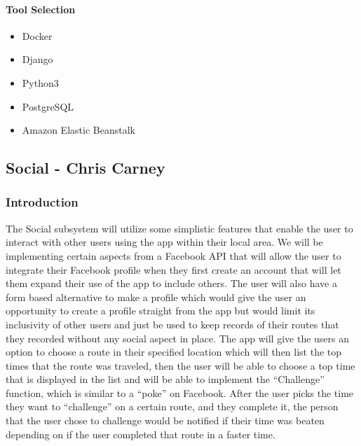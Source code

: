 \documentclass{article}
\begin{document}
\paragraph{Tool Selection}
\begin{itemize}
    \item Docker
    \item Django
    \item Python3
    \item PostgreSQL
    \item Amazon Elastic Beanstalk
\end{itemize}

\subsection{Social - Chris Carney}
\subsubsection{Introduction}
The Social subsystem will utilize some simplistic features that enable the user to interact with other users using the app within their local area. We will be implementing certain aspects from a Facebook API that will allow the user to integrate their Facebook profile when they first create an account that will let them expand their use of the app to include others. The user will also have a form based alternative to make a profile which would give the user an opportunity to create a profile straight from the app but would limit its inclusivity of other users and just be used to keep records of their routes that they recorded without any social aspect in place. 
The app will give the users an option to choose a route in their specified location which will then list the top times that the route was traveled, then the user will be able to choose a top time that is displayed in the list and will be able to implement the “Challenge” function, which is similar to a “poke” on Facebook. After the user picks the time they want to “challenge” on a certain route, and they complete it, the person that the user chose to challenge would be notified if their time was beaten depending on if the user completed that route in a faster time.
\end{document}
